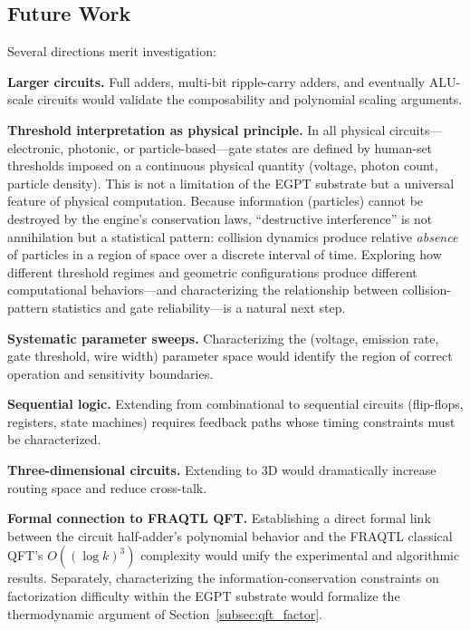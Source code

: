 \documentclass[11pt,a4paper]{article}
\begin{document}
\subsection{Future Work}

Several directions merit investigation:

\textbf{Larger circuits.} Full adders, multi-bit ripple-carry adders, and eventually ALU-scale circuits would validate the composability and polynomial scaling arguments.

\textbf{Threshold interpretation as physical principle.} In all physical circuits---electronic, photonic, or particle-based---gate states are defined by human-set thresholds imposed on a continuous physical quantity (voltage, photon count, particle density). This is not a limitation of the EGPT substrate but a universal feature of physical computation. Because information (particles) cannot be destroyed by the engine's conservation laws, ``destructive interference'' is not annihilation but a statistical pattern: collision dynamics produce relative \emph{absence} of particles in a region of space over a discrete interval of time. Exploring how different threshold regimes and geometric configurations produce different computational behaviors---and characterizing the relationship between collision-pattern statistics and gate reliability---is a natural next step.

\textbf{Systematic parameter sweeps.} Characterizing the (voltage, emission rate, gate threshold, wire width) parameter space would identify the region of correct operation and sensitivity boundaries.

\textbf{Sequential logic.} Extending from combinational to sequential circuits (flip-flops, registers, state machines) requires feedback paths whose timing constraints must be characterized.

\textbf{Three-dimensional circuits.} Extending to 3D would dramatically increase routing space and reduce cross-talk.

\textbf{Formal connection to FRAQTL QFT.} Establishing a direct formal link between the circuit half-adder's polynomial behavior and the FRAQTL classical QFT's $O((\log k)^3)$ complexity would unify the experimental and algorithmic results. Separately, characterizing the information-conservation constraints on factorization difficulty within the EGPT substrate would formalize the thermodynamic argument of Section~\ref{subsec:qft_factor}.


\end{document}
